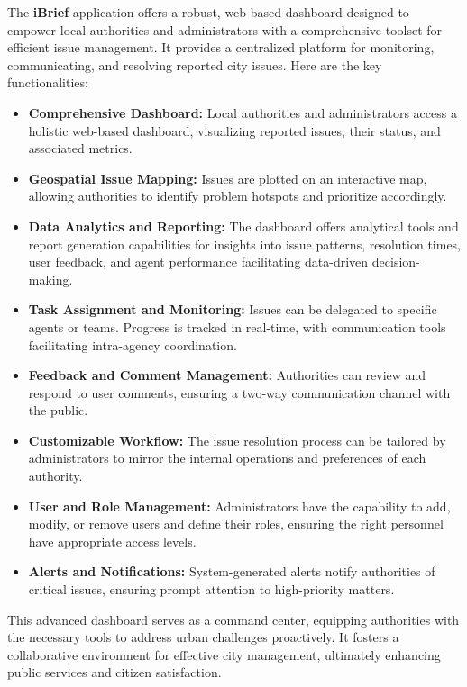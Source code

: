 The \textbf{iBrief} application offers a robust, web-based dashboard designed to empower local authorities and administrators with a comprehensive toolset for efficient issue management. It provides a centralized platform for monitoring, communicating, and resolving reported city issues. Here are the key functionalities:

\begin{itemize}
    \item \textbf{Comprehensive Dashboard:}
    Local authorities and administrators access a holistic web-based dashboard, visualizing reported issues, their status, and associated metrics.
    
    \item \textbf{Geospatial Issue Mapping:}
    Issues are plotted on an interactive map, allowing authorities to identify problem hotspots and prioritize accordingly.
    
    \item \textbf{Data Analytics and Reporting:}
    The dashboard offers analytical tools and report generation capabilities for insights into issue patterns, resolution times, user feedback, and agent performance facilitating data-driven decision-making.
    
    \item \textbf{Task Assignment and Monitoring:}
    Issues can be delegated to specific agents or teams. Progress is tracked in real-time, with communication tools facilitating intra-agency coordination.
    
    \item \textbf{Feedback and Comment Management:}
    Authorities can review and respond to user comments, ensuring a two-way communication channel with the public.
    
    \item \textbf{Customizable Workflow:}
    The issue resolution process can be tailored by administrators to mirror the internal operations and preferences of each authority.
    
    \item \textbf{User and Role Management:}
    Administrators have the capability to add, modify, or remove users and define their roles, ensuring the right personnel have appropriate access levels.
    
    \item \textbf{Alerts and Notifications:}
    System-generated alerts notify authorities of critical issues, ensuring prompt attention to high-priority matters.
\end{itemize}

This advanced dashboard serves as a command center, equipping authorities with the necessary tools to address urban challenges proactively. It fosters a collaborative environment for effective city management, ultimately enhancing public services and citizen satisfaction.